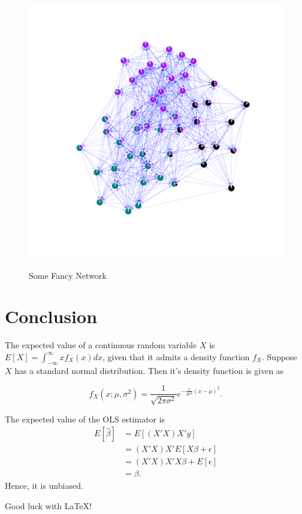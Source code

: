 \documentclass[12pt]{article}
\begin{document}
\begin{figure}[h]
	\centering
	\caption{Some Fancy Network}
	\includegraphics[width=.7\textwidth]{mmsbm.pdf}
	\label{fig: sbm}
\end{figure}

\section{Conclusion}

The expected value of a continuous random variable $X$ is $E[X] = \int_{-\infty}^\infty x f_{X}(x) dx$, given that it admits a density function $f_X$. Suppose $X$ has a standard normal distribution. Then it's density function is given as

\begin{equation}
f_X(x; \mu, \sigma^2) = \frac{1}{ \sqrt{ 2\pi \sigma^2 } } e^{-\frac{1}{2\sigma^2}(x-\mu)^2}.
\end{equation}

The expected value of the OLS estimator is
\begin{align*}
E[\hat\beta] &= E[(X'X)X'y] \\
&= (X'X)X'E[X\beta + \epsilon] \\
&= (X'X)X'X\beta + E[\epsilon] \\
&= \beta.
\end{align*}
Hence, it is unbiased.

\begin{center}
\Large Good luck with \LaTeX!
\end{center}
\end{document}
